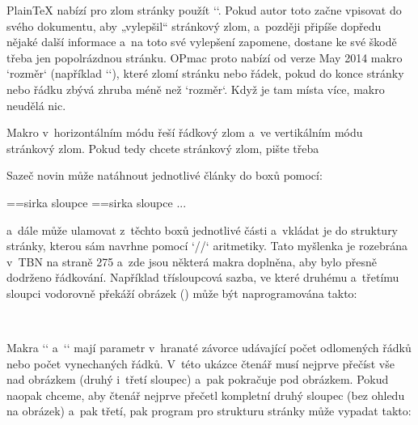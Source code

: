 { 


PlainTeX nabízí pro zlom stránky použít `\vfill\break`. Pokud autor toto začne vpisovat do svého dokumentu, aby „vylepšil“ stránkový zlom, a~později připíše dopředu nějaké další informace a~na toto své vylepšení zapomene, dostane ke své škodě třeba jen popolrázdnou stránku. OPmac proto nabízí od verze May 2014 makro `\maybebreak rozměr` (například `\maybebreak 2cm`), které zlomí stránku nebo řádek, pokud do konce stránky nebo řádku zbývá zhruba méně než `rozměr`. Když je tam místa více, makro neudělá nic. 



Makro v~horizontálním módu řeší řádkový zlom a~ve vertikálním módu stránkový zlom. Pokud tedy chcete stránkový zlom, pište třeba 

\begtt
\par\maybebreak 3.5cm 
\endtt

 


Sazeč novin může natáhnout jednotlivé články do boxů pomocí: 

\begtt
\setbox\clanekA=\vbox{\hsize=sirka sloupce   } 
\setbox\clanekB=\vbox{\hsize=sirka sloupce   } 
... 
\endtt


a~dále může ulamovat z~těchto boxů jednotlivé části a~vkládat je do struktury stránky, kterou sám navrhne pomocí `\hbox/\vbox/\vtop` aritmetiky. Tato myšlenka je rozebrána v~TBN na straně 275 a~zde jsou některá makra doplněna, aby bylo přesně dodrženo řádkování. Například třísloupcová sazba, ve které druhému a~třetímu sloupci vodorovně překáží obrázek () může být naprogramována takto: 

\begtt
\ulamuj\clanekA 
\hbox{\ulom[18]\kern\colsep 
      } 
\endtt


Makra `\ulom` a~`\vynech` mají parametr v~hranaté závorce udávající počet odlomených řádků nebo počet vynechaných řádků. V~této ukázce čtenář musí nejprve přečíst vše nad obrázkem (druhý i~třetí sloupec) a~pak pokračuje pod obrázkem. Pokud naopak chceme, aby čtenář nejprve přečetl kompletní druhý sloupec (bez ohledu na obrázek) a~pak třetí, pak program pro strukturu stránky může vypadat takto: 

\begtt
\hbox{\ulom[21]\kern\colsep 
      \kern\colsep 
      \vtop{\ulom[3]\vynech[14]\ulom[4]}%
     } 
\endtt


}

